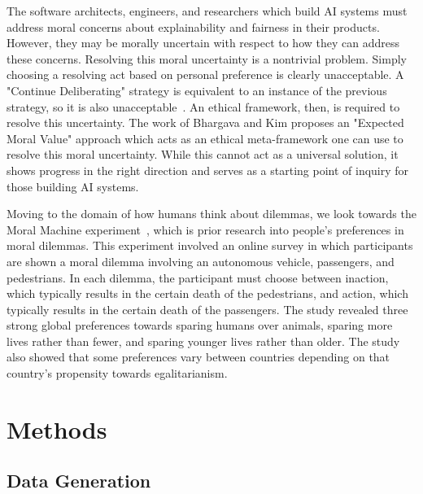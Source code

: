 \documentclass[]{report}
\begin{document}
The software architects, engineers, and researchers which build AI systems must address moral
concerns about explainability and fairness in their products. However, they may be morally uncertain
with respect to how they can address these concerns. Resolving this moral uncertainty is a
nontrivial problem. Simply choosing a resolving act based on personal preference is clearly
unacceptable. A "Continue Deliberating" strategy is equivalent to an instance of the previous
strategy, so it is also unacceptable~\cite{patrick2017robot}. An ethical framework, then, is
required to resolve this uncertainty. The work of Bhargava and Kim \cite{patrick2017robot} proposes
an "Expected Moral Value" approach which acts as an ethical meta-framework one can use to resolve
this moral uncertainty. While this cannot act as a universal solution, it shows progress in the
right direction and serves as a starting point of inquiry for those building AI systems.

Moving to the domain of how humans think about dilemmas, we look towards the Moral Machine
experiment~\cite{awad2018moral}, which is prior research into people's preferences in moral
dilemmas. This experiment involved an online survey in which participants are shown a moral dilemma
involving an autonomous vehicle, passengers, and pedestrians. In each dilemma, the participant must
choose between inaction, which typically results in the certain death of the pedestrians, and
action, which typically results in the certain death of the passengers. The study revealed three
strong global preferences towards sparing humans over animals, sparing more lives rather than fewer,
and sparing younger lives rather than older. The study also showed that some preferences vary
between countries depending on that country's propensity towards egalitarianism.

\FloatBarrier
\chapter{Methods}

\section{Data Generation}
\end{document}
